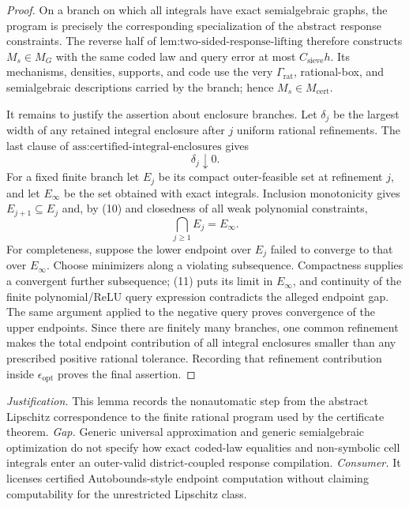 \documentclass{article}
\begin{document}
\begin{proof}
On a branch on which all integrals have exact semialgebraic graphs, the program is precisely the corresponding specialization of the abstract response constraints.  The reverse half of \(\text{lem:two-sided-response-lifting}\) therefore constructs \(M_s\in M_G\) with the same coded law and query error at most \(C_{\mathrm{sieve}}h\).  Its mechanisms, densities, supports, and code use the very \(\Gamma_{\mathrm{rat}}\), rational-box, and semialgebraic descriptions carried by the branch; hence \(M_s\in M_{\mathrm{cert}}\).

It remains to justify the assertion about enclosure branches.  Let \(\delta_j\) be the largest width of any retained integral enclosure after \(j\) uniform rational refinements.  The last clause of \(\text{ass:certified-integral-enclosures}\) gives
\[
\delta_j\downarrow0.                                             \tag{10}
\]
For a fixed finite branch let \(E_j\) be its compact outer-feasible set at refinement \(j\), and let \(E_\infty\) be the set obtained with exact integrals.  Inclusion monotonicity gives \(E_{j+1}\subseteq E_j\) and, by (10) and closedness of all weak polynomial constraints,
\[
\bigcap_{j\geq1}E_j=E_\infty.                                   \tag{11}
\]
For completeness, suppose the lower endpoint over \(E_j\) failed to converge to that over \(E_\infty\).  Choose minimizers along a violating subsequence.  Compactness supplies a convergent further subsequence; (11) puts its limit in \(E_\infty\), and continuity of the finite polynomial/ReLU query expression contradicts the alleged endpoint gap.  The same argument applied to the negative query proves convergence of the upper endpoints.  Since there are finitely many branches, one common refinement makes the total endpoint contribution of all integral enclosures smaller than any prescribed positive rational tolerance.  Recording that refinement contribution inside \(\epsilon_{\mathrm{opt}}\) proves the final assertion.
\end{proof}
\par\smallskip\noindent \textit{Justification.} This lemma records the nonautomatic step from the abstract Lipschitz correspondence to the finite rational program used by the certificate theorem. \textit{Gap.} Generic universal approximation and generic semialgebraic optimization do not specify how exact coded-law equalities and non-symbolic cell integrals enter an outer-valid district-coupled response compilation. \textit{Consumer.} It licenses certified Autobounds-style endpoint computation without claiming computability for the unrestricted Lipschitz class.
\end{document}
